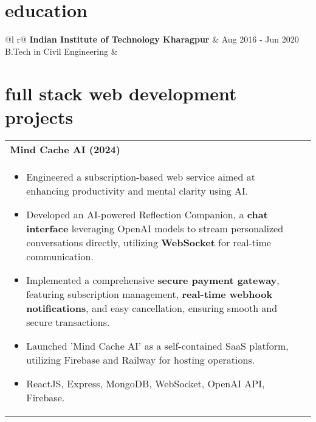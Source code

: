\documentclass[a4paper,8pt]{article}
\begin{document}
\vspace{4 pt}

\section{education}
\begin{tabularx}{\linewidth}{ @{}l r@{} }
\color[HTML]{1C033C} \textbf{Indian Institute of Technology Kharagpur} & \hfill \color[HTML]{371e77} Aug 2016 - Jun 2020 \\
\color[HTML]{371e77} B.Tech in Civil Engineering & \hfill \color[HTML]{4B28A4} \textit{\textbf{}} \\
\end{tabularx}

\vspace{-8pt}

\section{full stack web development projects}
\begin{tabularx}{\linewidth}{ @{}l r@{} }
\textbf{{Mind Cache AI (2024)}} \hfill \color[HTML]{371e77} \\[1pt]
\begin{minipage}[t]{\linewidth}
    \begin{itemize}[nosep,after=\strut, leftmargin=2em, itemsep=2pt]
        \item Engineered a subscription-based web service aimed at enhancing productivity and mental clarity using AI.
        \item Developed an AI-powered Reflection Companion, a \textbf{chat interface} leveraging OpenAI models to stream personalized conversations directly, utilizing \textbf{WebSocket} for real-time communication.
        \item Implemented a comprehensive \textbf{secure payment gateway}, featuring subscription management, \textbf{real-time webhook notifications}, and easy cancellation, ensuring smooth and secure transactions.
        \item Launched 'Mind Cache AI' as a self-contained SaaS platform, utilizing Firebase and Railway for hosting operations.
        \item ReactJS, Express, MongoDB, WebSocket, OpenAI API, Firebase.
    \end{itemize}
\end{minipage}
\end{tabularx}
\end{document}
